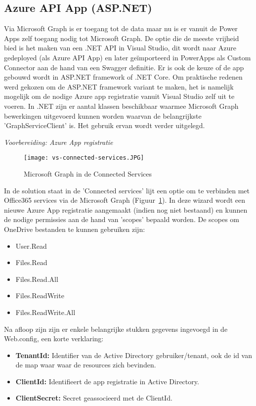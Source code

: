 \subsection{Azure API App (ASP.NET)}

Via Microsoft Graph is er toegang tot de data maar nu is er vanuit de Power Apps zelf toegang nodig tot Microsoft Graph. De optie die de meeste vrijheid bied is het maken van een .NET API in Visual Studio, dit wordt naar Azure gedeployed (als Azure API App) en later geïmporteerd in PowerApps als Custom Connector aan de hand van een Swagger definitie. Er is ook de keuze of de app gebouwd wordt in ASP.NET framework of .NET Core. Om praktische redenen werd gekozen om de ASP.NET framework variant te maken, het is namelijk mogelijk om de nodige Azure app registratie vanuit Visual Studio zelf uit te voeren.
In .NET zijn er aantal klassen beschikbaar waarmee Microsoft Graph bewerkingen uitgevoerd kunnen worden waarvan de belangrijkste 'GraphServiceClient' is. Het gebruik ervan wordt verder uitgelegd.

\textit{Voorbereiding: Azure App registratie}

\begin{figure}[h!]
    \texttt{[image: vs-connected-services.JPG]}
    \caption{Microsoft Graph in de Connected Services}
    \label{fig:vs-connected-services}
\end{figure}

In de solution staat in de 'Connected services' lijt een optie om te verbinden met Office365 services via de Microsoft Graph (Figuur~\ref{fig:vs-connected-services}). In deze wizard wordt een nieuwe Azure App registratie aangemaakt (indien nog niet bestaand) en kunnen de nodige permissies aan de hand van 'scopes' bepaald worden. De scopes om OneDrive bestanden te kunnen gebruiken zijn:
\begin{itemize}
    \item User.Read 
    \item Files.Read 
    \item Files.Read.All 
    \item Files.ReadWrite 
    \item Files.ReadWrite.All
\end{itemize}

Na afloop zijn zijn er enkele belangrijke stukken gegevens ingevoegd in de Web.config, een korte verklaring:
\begin{itemize}
    \item \textbf{TenantId:} Identifier van de Active Directory gebruiker/tenant, ook de id van de map waar waar de resources zich bevinden.
    \item \textbf{ClientId:} Identifieert de app registratie in Active Directory.
    \item \textbf{ClientSecret:} Secret geassocieerd met de ClientId.
\end{itemize}

